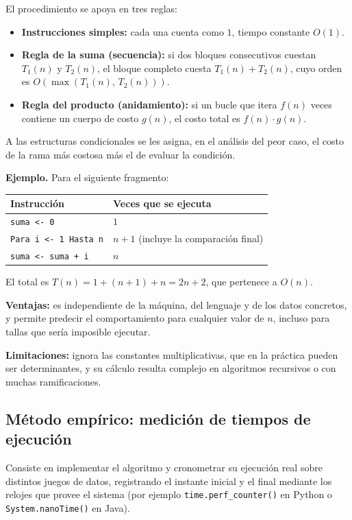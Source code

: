 \documentclass[12pt]{article}
\newcommand{\codigo}[1]{\texttt{\small #1}}
\begin{document}
El procedimiento se apoya en tres reglas:

\begin{itemize}[leftmargin=2em]
    \item \textbf{Instrucciones simples:} cada una cuenta como $1$, tiempo constante $O(1)$.
    \item \textbf{Regla de la suma (secuencia):} si dos bloques consecutivos cuestan $T_1(n)$ y $T_2(n)$, el bloque completo cuesta $T_1(n) + T_2(n)$, cuyo orden es $O(\max(T_1(n),\, T_2(n)))$.
    \item \textbf{Regla del producto (anidamiento):} si un bucle que itera $f(n)$ veces contiene un cuerpo de costo $g(n)$, el costo total es $f(n) \cdot g(n)$.
\end{itemize}

A las estructuras condicionales se les asigna, en el análisis del peor caso, el costo de la rama más costosa más el de evaluar la condición.

\textbf{Ejemplo.} Para el siguiente fragmento:

\begin{center}
\begin{tabular}{ll}
\toprule
\textbf{Instrucción} & \textbf{Veces que se ejecuta} \\
\midrule
\codigo{suma <- 0} & $1$ \\
\codigo{Para i <- 1 Hasta n} & $n+1$ (incluye la comparación final) \\
\codigo{\quad suma <- suma + i} & $n$ \\
\bottomrule
\end{tabular}
\end{center}

El total es $T(n) = 1 + (n+1) + n = 2n + 2$, que pertenece a $O(n)$.

\textbf{Ventajas:} es independiente de la máquina, del lenguaje y de los datos concretos, y permite predecir el comportamiento para cualquier valor de $n$, incluso para tallas que sería imposible ejecutar.

\textbf{Limitaciones:} ignora las constantes multiplicativas, que en la práctica pueden ser determinantes, y su cálculo resulta complejo en algoritmos recursivos o con muchas ramificaciones.

\subsection{Método empírico: medición de tiempos de ejecución}

Consiste en implementar el algoritmo y cronometrar su ejecución real sobre distintos juegos de datos, registrando el instante inicial y el final mediante los relojes que provee el sistema (por ejemplo \codigo{time.perf\_counter()} en Python o \codigo{System.nanoTime()} en Java).
\end{document}
